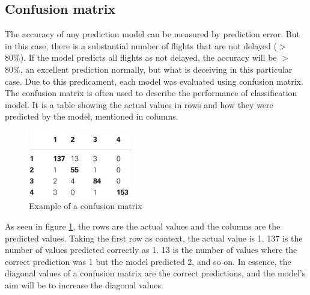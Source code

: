 \subsection{Confusion matrix}
The accuracy of any prediction model can be measured by prediction error. But in this case, there is a substantial number of flights that are not delayed ($>$80\%). If the model predicts all flights as not delayed, the accuracy will be $>$80\%, an excellent prediction normally, but what is deceiving in this particular case. Due to this predicament, each model was evaluated using confusion matrix. The confusion matrix is often used to describe the performance of classification model. It is a table showing the actual values in rows and how they were predicted by the model, mentioned in columns. 

\begin{figure} 
\vspace{-20pt}
  \begin{center}
    \includegraphics[width=0.4\textwidth]{Figures/confusion_matrix_ex.png}
    \caption{Example of a confusion matrix}
    \label{fig:confusion_matrix_ex}
  \end{center}
  \vspace{-20pt}
  \vspace{1pt}
\end{figure} 

As seen in figure \ref{fig:confusion_matrix_ex}, the rows are the actual values and the columns are the predicted values. Taking the first row as context, the actual value is 1. 137 is the number of values predicted correctly as 1. 13 is the number of values where the correct prediction was 1 but the model predicted 2, and so on. In essence, the diagonal values of a confusion matrix are the correct predictions, and the model's aim will be to increase the diagonal values.

